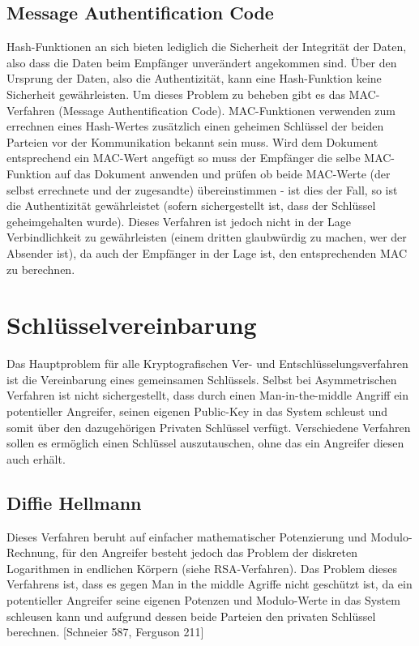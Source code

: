 \documentclass[10pt, a4paper]{scrreprt}
\begin{document}
\subsection{Message Authentification Code}
Hash-Funktionen an sich bieten lediglich die Sicherheit der Integrität der Daten, also dass die Daten beim Empfänger unverändert angekommen sind. Über den Ursprung der Daten, also die Authentizität, kann eine Hash-Funktion keine Sicherheit gewährleisten. Um dieses Problem zu beheben gibt es das MAC-Verfahren (Message Authentification Code). MAC-Funktionen verwenden zum errechnen eines Hash-Wertes zusätzlich einen geheimen Schlüssel der beiden Parteien vor der Kommunikation bekannt sein muss. Wird dem Dokument entsprechend ein MAC-Wert angefügt so muss der Empfänger die selbe MAC-Funktion auf das Dokument anwenden und prüfen ob beide MAC-Werte (der selbst errechnete und der zugesandte) übereinstimmen - ist dies der Fall, so ist die Authentizität gewährleistet (sofern sichergestellt ist, dass der Schlüssel geheimgehalten wurde). Dieses Verfahren ist jedoch nicht in der Lage Verbindlichkeit zu gewährleisten (einem dritten glaubwürdig zu machen, wer der Absender ist), da auch der Empfänger in der Lage ist, den entsprechenden MAC zu berechnen. 


\section{Schlüsselvereinbarung} 
Das Hauptproblem für alle Kryptografischen Ver- und Entschlüsselungsverfahren ist die Vereinbarung eines gemeinsamen Schlüssels. Selbst bei Asymmetrischen Verfahren ist nicht sichergestellt, dass durch einen Man-in-the-middle Angriff ein potentieller Angreifer, seinen eigenen Public-Key in das System schleust und somit über den dazugehörigen Privaten Schlüssel verfügt. Verschiedene Verfahren sollen es ermöglich einen Schlüssel auszutauschen, ohne das ein Angreifer diesen auch erhält.

\subsection{Diffie Hellmann}
Dieses Verfahren beruht auf einfacher mathematischer Potenzierung und Modulo-Rechnung, für den Angreifer besteht jedoch das Problem der diskreten Logarithmen in endlichen Körpern (siehe RSA-Verfahren). Das Problem dieses Verfahrens ist, dass es gegen Man in the middle Agriffe nicht geschützt ist, da ein potentieller Angreifer seine eigenen Potenzen und Modulo-Werte in das System schleusen kann und aufgrund dessen beide Parteien den privaten Schlüssel berechnen. [Schneier 587, Ferguson 211]
\end{document}

